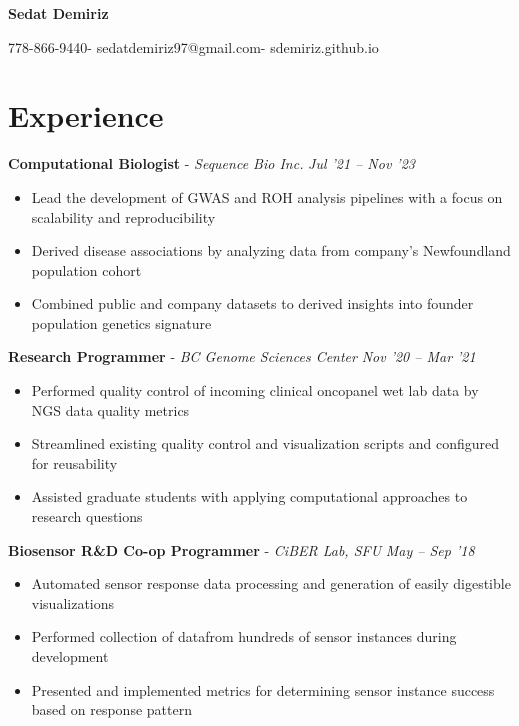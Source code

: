 \documentclass{article}
\makeatletter
\newcommand{\name}{Sedat Demiriz}
\newcommand{\email}{sedatdemiriz97@gmail.com}
\newcommand{\phone}{778-866-9440}
\newcommand{\website}{sdemiriz.github.io}
\newcommand{\experienceheader}[3]{\customitem \textbf{#1} - \textit{#2} \hfill \textit{#3}}
\newcommand{\customsection}[1]{\section*{#1} \vspace{-.3cm} \hrulefill}
\makeatother
\begin{document}
\begin{minipage}[t]{1\textwidth} 
  \centering \Huge 
  \textbf{\name} \vspace{.5cm} 
\end{minipage}
\begin{minipage}[t]{1\textwidth} 
  \centering \normalsize 
  \phone \hspace{.1cm}-\hspace{.1cm} \email \hspace{.1cm}-\hspace{.1cm} \website 
\end{minipage}

\customsection{Experience}
\begin{itemize}
    \experienceheader{Computational Biologist}{Sequence Bio Inc.}{Jul '21 -- Nov '23}
    \begin{itemize}
      \item Lead the development of GWAS and ROH analysis pipelines with a focus on scalability and reproducibility
      \item Derived disease associations by analyzing data from company's Newfoundland population cohort
      \item Combined public and company datasets to derived insights into founder population genetics signature
    \end{itemize}
  \experienceheader{Research Programmer}{BC Genome Sciences Center}{Nov '20 -- Mar '21}
    \begin{itemize}
      \item Performed quality control of incoming clinical oncopanel wet lab data by NGS data quality metrics
      \item Streamlined existing quality control and visualization scripts and configured for reusability
      \item Assisted graduate students with applying computational approaches to research questions
    \end{itemize}
  \experienceheader{Biosensor R\&D Co-op Programmer}{CiBER Lab, SFU}{May -- Sep '18}
    \begin{itemize}
      \item Automated sensor response data processing and generation of easily digestible visualizations
      \item Performed collection of datafrom hundreds of sensor instances during development
      \item Presented and implemented metrics for determining sensor instance success based on response pattern

\end{itemize}
\end{itemize}
\end{document}

